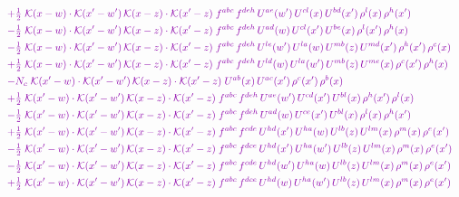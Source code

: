 \documentclass[10pt]{article}
\numberwithin{equation}{section}
\begin{document}
\begin{align}
&\quad{\color{CC}+\tfrac{1}{2}\;\mathcal{K}(x-w)\cdot\mathcal{K}(x'-w')\,\mathcal{K}(x-z)\cdot\mathcal{K}(x'-z)\;f^{abc}\,f^{deh}\,U^{ae}(w')\,U^{cl}(x)\,U^{bd}(x')\,\rho^{l}(x)\,\rho^{h}(x')}\notag\\
&\quad{\color{CC}-\tfrac{1}{2}\;\mathcal{K}(x-w)\cdot\mathcal{K}(x'-w')\,\mathcal{K}(x-z)\cdot\mathcal{K}(x'-z)\;f^{abc}\,f^{deh}\,U^{ad}(w)\,U^{cl}(x')\,U^{be}(x)\,\rho^{l}(x')\,\rho^{h}(x)}\notag\\
&\quad{\color{CC}-\tfrac{1}{2}\;\mathcal{K}(x-w)\cdot\mathcal{K}(x'-w')\,\mathcal{K}(x-z)\cdot\mathcal{K}(x'-z)\;f^{abc}\,f^{deh}\,U^{le}(w')\,U^{la}(w)\,U^{mb}(z)\,U^{md}(x')\,\rho^{h}(x')\,\rho^{c}(x)}\notag\\
&\quad{\color{CC}+\tfrac{1}{2}\;\mathcal{K}(x-w)\cdot\mathcal{K}(x'-w')\,\mathcal{K}(x-z)\cdot\mathcal{K}(x'-z)\;f^{abc}\,f^{deh}\,U^{ld}(w)\,U^{la}(w')\,U^{mb}(z)\,U^{me}(x)\,\rho^{c}(x')\,\rho^{h}(x)}\notag\\
&\quad{\color{CC}-N_c\;\mathcal{K}(x'-w)\cdot\mathcal{K}(x'-w')\,\mathcal{K}(x-z)\cdot\mathcal{K}(x'-z)\;U^{ab}(x)\,U^{ac}(x')\,\rho^{c}(x')\,\rho^{b}(x)}\notag\\
&\quad{\color{CC}+\tfrac{1}{2}\;\mathcal{K}(x'-w)\cdot\mathcal{K}(x'-w')\,\mathcal{K}(x-z)\cdot\mathcal{K}(x'-z)\;f^{abc}\,f^{deh}\,U^{ae}(w')\,U^{cd}(x')\,U^{bl}(x)\,\rho^{h}(x')\,\rho^{l}(x)}\notag\\
&\quad{\color{CC}-\tfrac{1}{2}\;\mathcal{K}(x'-w)\cdot\mathcal{K}(x'-w')\,\mathcal{K}(x-z)\cdot\mathcal{K}(x'-z)\;f^{abc}\,f^{deh}\,U^{ad}(w)\,U^{ce}(x')\,U^{bl}(x)\,\rho^{l}(x)\,\rho^{h}(x')}\notag\\
&\quad{\color{CC}+\tfrac{1}{2}\;\mathcal{K}(x'-w)\cdot\mathcal{K}(x'-w')\,\mathcal{K}(x-z)\cdot\mathcal{K}(x'-z)\;f^{abc}\,f^{cde}\,U^{hd}(x')\,U^{ha}(w)\,U^{lb}(z)\,U^{lm}(x)\,\rho^{m}(x)\,\rho^{e}(x')}\notag\\
&\quad{\color{CC}-\tfrac{1}{2}\;\mathcal{K}(x'-w)\cdot\mathcal{K}(x'-w')\,\mathcal{K}(x-z)\cdot\mathcal{K}(x'-z)\;f^{abc}\,f^{dce}\,U^{hd}(x')\,U^{ha}(w')\,U^{lb}(z)\,U^{lm}(x)\,\rho^{m}(x)\,\rho^{e}(x')}\notag\\
&\quad{\color{CC}-\tfrac{1}{2}\;\mathcal{K}(x'-w)\cdot\mathcal{K}(x'-w')\,\mathcal{K}(x-z)\cdot\mathcal{K}(x'-z)\;f^{abc}\,f^{cde}\,U^{hd}(w')\,U^{ha}(w)\,U^{lb}(z)\,U^{lm}(x)\,\rho^{m}(x)\,\rho^{e}(x')}\notag\\
&\quad{\color{CC}+\tfrac{1}{2}\;\mathcal{K}(x'-w)\cdot\mathcal{K}(x'-w')\,\mathcal{K}(x-z)\cdot\mathcal{K}(x'-z)\;f^{abc}\,f^{dce}\,U^{hd}(w)\,U^{ha}(w')\,U^{lb}(z)\,U^{lm}(x)\,\rho^{m}(x)\,\rho^{e}(x')}\notag\\

\end{align}
\end{document}
